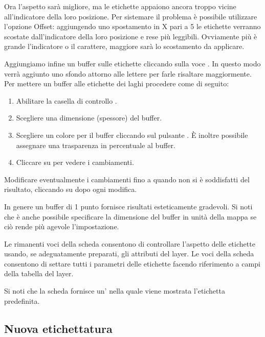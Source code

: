 Ora l'aspetto sarà migliore, ma le etichette appaiono ancora troppo vicine
all'indicatore della loro posizione. Per sistemare il problema è possibile
utilizzare l'opzione Offset: aggiungendo uno spostamento in X pari a 5
le etichette verranno scostate dall'indicatore della loro posizione e rese
più leggibili. Ovviamente più è grande l'indicatore o il carattere, maggiore
sarà lo scostamento da applicare.

Aggiungiamo infine un buffer sulle etichette cliccando sulla voce
. In questo modo verrà aggiunto uno sfondo attorno alle lettere
per farle risaltare maggiormente. Per mettere un buffer alle etichette dei
laghi procedere come di seguito:

\begin{enumerate}
\item Abilitare la casella di controllo .
\item Scegliere una dimensione (spessore) del buffer.
\item Scegliere un colore per il buffer cliccando sul pulsante
. È inoltre possibile assegnare una trasparenza in percentuale
al buffer.
\item Cliccare su  per vedere i cambiamenti.
\end{enumerate} 

Modificare eventualmente i cambiamenti fino a quando non si è soddisfatti del
risultato, cliccando su  dopo ogni modifica.

In genere un buffer di 1 punto fornisce risultati esteticamente gradevoli.
Si noti che è anche possibile specificare la dimensione del buffer in unità
della mappa se ciò rende più agevole l'impostazione.

Le rimanenti voci della scheda  consentono di controllare
l'aspetto delle etichette usando, se adeguatamente preparati, gli attributi
del layer. Le voci della scheda  consentono di settare
tutti i parametri delle etichette facendo riferimento a campi della tabella
del layer.

Si noti che la scheda  fornisce un'
nella quale viene mostrata l'etichetta predefinita.

\subsection{Nuova etichettatura}\label{newlabel}

